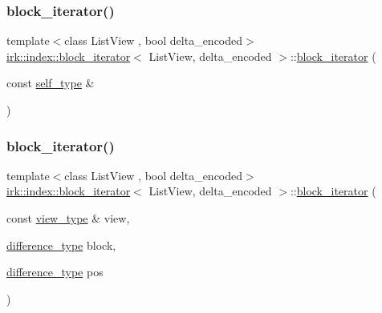 \subsubsection{\texorpdfstring{block\+\_\+iterator()}{block\_iterator()}\hspace{0.1cm}{\footnotesize\ttfamily [2/3]}}
{\footnotesize\ttfamily template$<$class List\+View , bool delta\+\_\+encoded$>$ \\
\mbox{\hyperlink{classirk_1_1index_1_1block__iterator}{irk\+::index\+::block\+\_\+iterator}}$<$ List\+View, delta\+\_\+encoded $>$\+::\mbox{\hyperlink{classirk_1_1index_1_1block__iterator}{block\+\_\+iterator}} (\begin{DoxyParamCaption}\item[{const \mbox{\hyperlink{classirk_1_1index_1_1block__iterator_a338ee8fee726492e9f8bbad4b4d75766}{self\+\_\+type}} \&}]{ }\end{DoxyParamCaption})\hspace{0.3cm}{\ttfamily [default]}}

\mbox{\label{classirk_1_1index_1_1block__iterator_a485803aa36bf95c6c5e401e44a432c1b}} 
\subsubsection{\texorpdfstring{block\+\_\+iterator()}{block\_iterator()}\hspace{0.1cm}{\footnotesize\ttfamily [3/3]}}
{\footnotesize\ttfamily template$<$class List\+View , bool delta\+\_\+encoded$>$ \\
\mbox{\hyperlink{classirk_1_1index_1_1block__iterator}{irk\+::index\+::block\+\_\+iterator}}$<$ List\+View, delta\+\_\+encoded $>$\+::\mbox{\hyperlink{classirk_1_1index_1_1block__iterator}{block\+\_\+iterator}} (\begin{DoxyParamCaption}\item[{const \mbox{\hyperlink{classirk_1_1index_1_1block__iterator_a75bc89b691db97f719af7284ee91afa0}{view\+\_\+type}} \&}]{view,  }\item[{\mbox{\hyperlink{classirk_1_1index_1_1block__iterator_a3a314c46329b349e7534670b21978ab6}{difference\+\_\+type}}}]{block,  }\item[{\mbox{\hyperlink{classirk_1_1index_1_1block__iterator_a3a314c46329b349e7534670b21978ab6}{difference\+\_\+type}}}]{pos }\end{DoxyParamCaption})\hspace{0.3cm}{\ttfamily [inline]}}

